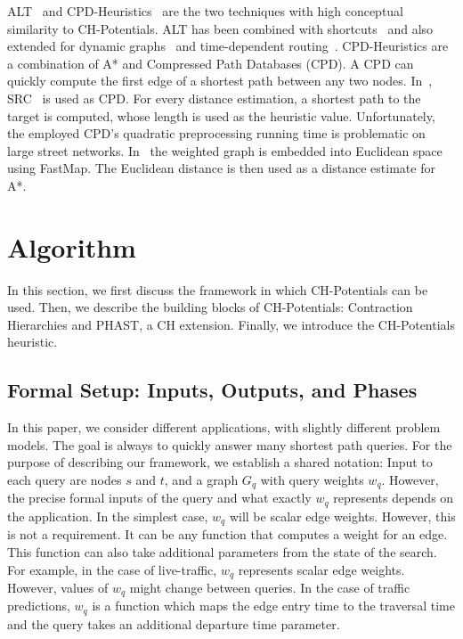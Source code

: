 \documentclass[a4paper,USenglish,cleveref, autoref, thm-restate]{lipics-v2019}
\begin{document}
ALT~\cite{gh-cspas-05,gw-cppsp-05} and CPD-Heuristics~\cite{DBLP:conf/ijcai/BonoGHS19} are the two techniques with high conceptual similarity to CH-Potentials.
ALT has been combined with shortcuts~\cite{bdsssw-chgds-10} and also extended for dynamic graphs~\cite{dw-lbrdg-07} and time-dependent routing~\cite{ndls-bastd-12,dn-crdtd-12}.
%
CPD-Heuristics are a combination of A* and Compressed Path Databases (CPD).
A CPD can quickly compute the first edge of a shortest path between any two nodes.
In~\cite{DBLP:conf/ijcai/BonoGHS19}, SRC~\cite{DBLP:conf/socs/StrasserHB14} is used as CPD.
For every distance estimation, a shortest path to the target is computed, whose length is used as the heuristic value.
Unfortunately, the employed CPD's quadratic preprocessing running time is problematic on large street networks.
%
%
In~\cite{DBLP:conf/ijcai/0002UJAKK18} the weighted graph is embedded into Euclidean space using FastMap. %
The Euclidean distance is then used as a distance estimate for A*.

\section{Algorithm}\label{sec:main-algo}

In this section, we first discuss the framework in which CH-Potentials can be used.
Then, we describe the building blocks of CH-Potentials: Contraction Hierarchies and PHAST, a CH extension.
Finally, we introduce the CH-Potentials heuristic.

\subsection{Formal Setup: Inputs, Outputs, and Phases}

In this paper, we consider different applications, with slightly different problem models.
The goal is always to quickly answer many shortest path queries.
For the purpose of describing our framework, we establish a shared notation:
Input to each query are nodes $s$ and $t$, and a graph $G_q$ with query weights $w_q$.
However, the precise formal inputs of the query and what exactly $w_q$ represents depends on the application.
In the simplest case, $w_q$ will be scalar edge weights.
However, this is not a requirement.
It can be any function that computes a weight for an edge.
This function can also take additional parameters from the state of the search.
For example, in the case of live-traffic, $w_q$ represents scalar edge weights.
However, values of $w_q$ might change between queries.
In the case of traffic predictions, $w_q$ is a function which maps the edge entry time to the traversal time and the query takes an additional departure time parameter.
\end{document}
